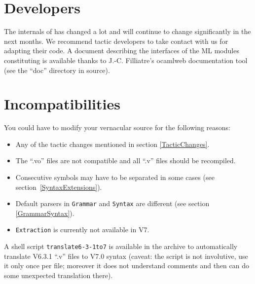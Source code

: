 \documentclass[11pt]{article}
\begin{document}
\section{Developers}
\label{Developers}
The internals of {\Coq} has changed a lot and will continue to change
significantly in the next months. We recommend tactic developers to
take contact with us for adapting their code. A document describing
the interfaces of the ML modules constituting {\Coq} is available
thanks to J.-C. Filliatre's ocamlweb
documentation tool (see the ``doc'' directory in {\Coq} source).

\section{Incompatibilities}
\label{Incompatibilities}

  You could have to modify your vernacular source for the following
  reasons:

  \begin{itemize}
 
  \item Any of the tactic changes mentioned in section \ref{TacticChanges}.

  \item The ``.vo'' files are not compatible and all ``.v'' files should
  be recompiled.

  \item Consecutive symbols may have to be separated in some cases (see
  section~\ref{SyntaxExtensions}).

  \item Default parsers in {\tt Grammar} and {\tt Syntax} are
  different (see section \ref{GrammarSyntax}).

  \item {\tt Extraction} is currently not available in {\Coq} V7.

  \end{itemize}

A shell script \verb=translate6-3-1to7= is available in the archive to
automatically translate V6.3.1 ``.v'' files to V7.0 syntax (caveat:
the script is not involutive, use it only once per file; moreover it
does not understand comments and then can do some unexpected
translation there).

\end{document}
